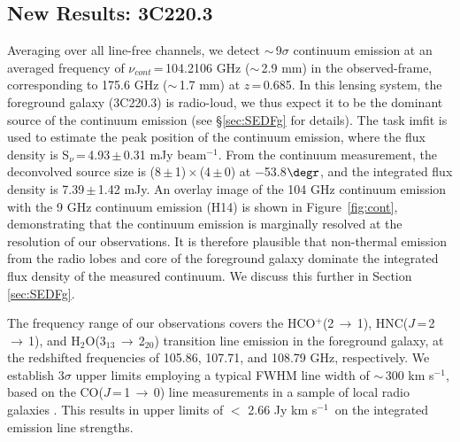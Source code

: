 \documentclass[twocolumn,apj,numberedappendix]{emulateapj}
\newcommand{\rarr}{$\rightarrow$}
\newcommand{\pmOne}{\mbox{$^{-1}$}}
\begin{document}
\subsection{New Results: 3C220.3} 
Averaging over all line-free channels, we detect $\sim$\,9$\sigma$ continuum emission at an averaged frequency of $\nu_{cont}$\,=\,104.2106 GHz ($\sim$\,2.9 mm) in the observed-frame, corresponding to 175.6 GHz ($\sim$\,1.7 mm) at $z$\,=\,0.685. In this lensing system, the 
foreground galaxy (3C220.3) is radio-loud, we thus expect it to be the dominant source of the continuum emission (see \S \ref{sec:SEDFg} for details). The task {\sc imfit} is used to estimate the peak position of the continuum emission, where the flux density is S$_\nu$\,=\,4.93\,$\pm$\,0.31\,\,mJy\,\,beam\pmOne. From the continuum measurement, the deconvolved source size 
is (8\,$\pm$\,1)\,$\times$\,(4\,$\pm$\,0) at $-$53.8$\degr$, and the integrated flux density is 7.39\,$\pm$\,1.42\,\,mJy. An overlay image of the 104 GHz  
continuum emission with the 9 GHz continuum emission (H14) is shown in Figure~\ref{fig:cont}, demonstrating that the continuum 
emission is marginally resolved at the resolution of our observations. It is therefore plausible that non-thermal emission from the radio lobes and core of the foreground galaxy dominate the integrated flux 
density of the measured continuum. We discuss this further in Section \ref{sec:SEDFg}. \par
The frequency range of our observations covers the HCO$^+$(2\,\rarr\,1), HNC($J$\,=\,2\,$\rightarrow$\,1), and H$_2$O(3$_{13}$\,\rarr\,2$_{20}$) 
transition line emission in the foreground galaxy, at 
the redshifted frequencies of 105.86, 107.71, and 108.79\,\,GHz, respectively. We establish 3$\sigma$ upper limits employing a typical FWHM line width of 
$\sim$\,300\,\,km\,\,s\pmOne, based on the CO($J$\,=\,1\,$\rightarrow$\,0) line measurements in a sample of local radio galaxies \citep[$z$ $<$ 0.1; ][]{Smolcic11a}. This results in upper limits of $<$ 2.66\,\,Jy\,\,km\,\,s\pmOne\ on the integrated emission line strengths.
\end{document}
